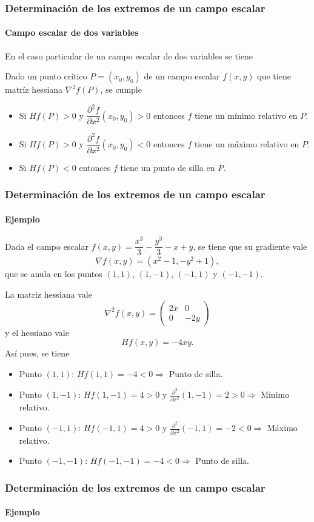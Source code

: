\begin{frame}
\frametitle{Determinación de los extremos de un campo escalar}
\framesubtitle{Campo escalar de dos variables}
En el caso particular de un campo escalar de dos variables se tiene
\begin{teorema}
Dado un punto crítico $P=(x_0,y_0)$ de un campo escalar $f(x,y)$ que tiene matríz hessiana $\nabla^2f(P)$, se cumple
\begin{itemize}
\item Si $Hf(P)>0$ y $\dfrac{\partial^2 f}{\partial x^2}(x_0,y_0)>0$ entonces $f$ tiene un mínimo relativo en $P$.
\item Si $Hf(P)>0$ y $\dfrac{\partial^2 f}{\partial x^2}(x_0,y_0)<0$ entonces $f$ tiene un máximo relativo en $P$.
\item Si $Hf(P)<0$ entonces $f$ tiene un punto de silla en $P$.
\end{itemize}
\end{teorema}
\end{frame}


\begin{frame}
\frametitle{Determinación de los extremos de un campo escalar}
\framesubtitle{Ejemplo}
Dada el campo escalar $f(x,y)=\dfrac{x^3}{3}-\dfrac{y^3}{3}-x+y$, se tiene que su gradiente vale
\[
\nabla f(x,y)= (x^2-1,-y^2+1),
\]
que se anula en los puntos $(1,1)$, $(1,-1)$, $(-1,1)$ y $(-1,-1)$.

La matriz hessiana vale 
\[
\nabla^2f(x,y) = \left(
\begin{array}{cc}
2x & 0\\
0 & -2y
\end{array}
\right)
\]
y el hessiano vale
\[
Hf(x,y) = -4xy.
\]
Así pues, se tiene
\begin{itemize}
\item Punto $(1,1)$: $Hf(1,1)=-4<0 \Rightarrow$ Punto de silla.
\item Punto $(1,-1)$: $Hf(1,-1)=4>0$ y $\frac{\partial^2}{\partial x^2}(1,-1)=2>0 \Rightarrow$ Mínimo relativo.
\item Punto $(-1,1)$: $Hf(-1,1)=4>0$ y $\frac{\partial^2}{\partial x^2}(-1,1)=-2<0 \Rightarrow$ Máximo relativo.
\item Punto $(-1,-1)$: $Hf(-1,-1)=-4<0 \Rightarrow$ Punto de silla.
\end{itemize}
\end{frame}


\begin{frame}
\frametitle{Determinación de los extremos de un campo escalar}
\framesubtitle{Ejemplo}
\begin{center}
\scalebox{1}{}
\end{center}
\end{frame}

